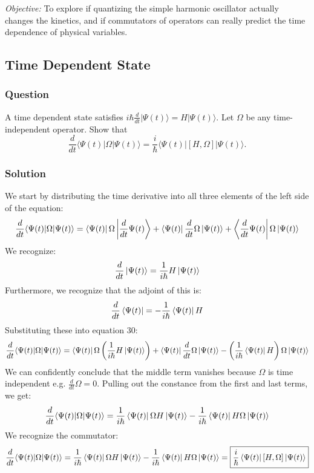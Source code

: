 \documentclass[12pt]{article}
\begin{document}
\textit{Objective:} To explore if quantizing the simple harmonic oscillator actually changes the kinetics, and if commutators of operators can really predict the time dependence of physical variables.

\subsection{Time Dependent State}
\subsubsection{Question}
A time dependent state satisfies $i\hbar \frac{d}{dt} |\Psi(t)\rangle = H|\Psi(t)\rangle$. Let $\Omega$ be any time-independent operator. Show that 
\[
\frac{d}{dt} \langle \Psi(t)|\Omega|\Psi(t)\rangle = \frac{i}{\hbar} \langle \Psi(t)|[H, \Omega]|\Psi(t)\rangle.
\]
\subsubsection{Solution}
We start by distributing the time derivative into all three elements of the left side of the equation:
\begin{equation}
    \frac{d}{dt} \langle \Psi(t)|\Omega|\Psi(t)\rangle =  \bra{\Psi(t)}\Omega\ket{\frac{d}{dt}\Psi(t)} + \bra{\Psi(t)}\frac{d}{dt}\Omega \ket{\Psi(t) } + \bra{\frac{d}{dt}\Psi(t)}\Omega\ket{\Psi(t)}
\end{equation}
We recognize:
\begin{equation}
    \frac{d}{dt}\ket{\Psi (t)} = \frac{1}{i\hbar}H\ket{\Psi (t)}
\end{equation}
Furthermore, we recognize that the adjoint of this is:
\begin{equation}
    \frac{d}{dt}\bra{\Psi (t)} = -\frac{1}{i\hbar}\bra{\Psi (t)}H
\end{equation}
Substituting these into equation 30:
\begin{equation}
    \frac{d}{dt} \langle \Psi(t)|\Omega|\Psi(t)\rangle =  \bra{\Psi(t)}\Omega\left(\frac{1}{i\hbar}H\ket{\Psi (t)}\right) + \bra{\Psi(t)}\frac{d}{dt}\Omega \ket{\Psi(t) } - \left(\frac{1}{i\hbar}\bra{\Psi (t)}H\right) \Omega\ket{\Psi(t)}
\end{equation}
We can confidently conclude that the middle term vanishes because \(\Omega\) is time independent e.g. $\frac{d}{dt}\Omega =0$. Pulling out the constance from the first and last terms, we get:
\begin{equation}
    \frac{d}{dt} \langle \Psi(t)|\Omega|\Psi(t)\rangle =  \frac{1}{i\hbar}\bra{\Psi(t)}\Omega H\ket{\Psi (t)} - \frac{1}{i\hbar}\bra{\Psi (t)}H\Omega\ket{\Psi(t)}
\end{equation}
We recognize the commutator:
\begin{equation}
    \frac{d}{dt} \langle \Psi(t)|\Omega|\Psi(t)\rangle =  \frac{1}{i\hbar}\bra{\Psi(t)}\Omega H\ket{\Psi (t)} - \frac{1}{i\hbar}\bra{\Psi (t)}H\Omega\ket{\Psi(t)} = \boxed{\frac{i}{\hbar}\bra{\Psi(t)}[H, \Omega]\ket{\Psi(t)}}
\end{equation}
\end{document}
